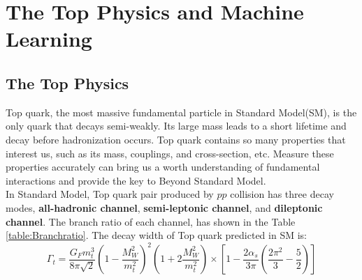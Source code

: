 
\chapter{The Top Physics and Machine Learning}

\section{The Top Physics}

Top quark, the most massive fundamental particle in Standard Model(SM), is the only quark that decays semi-weakly. Its large mass leads to a short lifetime and decay before hadronization occurs. Top quark contains so many properties that interest us, such as its mass, couplings, and cross-section, etc. Measure these properties accurately can bring us a worth understanding of fundamental interactions and provide the key to Beyond Standard Model.\cite{Zyla:2020zbs}
\\
In Standard Model, Top quark pair produced by $pp$ collision has three decay modes, \textbf{all-hadronic channel}, \textbf{semi-leptonic channel}, and \textbf{dileptonic channel}. The branch ratio of each channel, has shown in the Table \ref{table:Branchratio}. The decay width of Top quark predicted in SM is\cite{A.Quadt:2008TopPhysics}: 
\begin{equation}
	\Gamma_{t} = \frac{G_{F}m_{t}^{3}}{8\pi\sqrt{2}}\left(1-\frac{M_{W}^{2}}{m_{t}^{2}}\right)^{2}\left(1+2\frac{M_{W}^{2}}{m_{t}^{2}}\right)\times\left[1 - \frac{2\alpha_{s}}{3\pi}\left( \frac{2\pi^{2}}{3} - \frac{5}{2}\right) \right]
\end{equation}
\\


